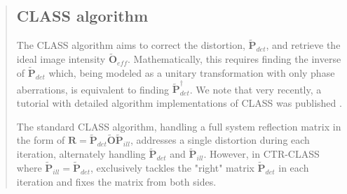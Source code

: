 \documentclass[12pt]{article}
\newenvironment{ourresponse}
    {\begin{tcolorbox}[width=\linewidth,breakable,enhanced,colback=gray!5,colframe=responsecolor!50,title=Response,left=5pt,right=5pt]}
    {\end{tcolorbox}}
\begin{document}
\begin{enumerate}[label=\arabic*.]
\begin{ourresponse}
\begin{quote}
            \subsection*{CLASS algorithm}
            
            The CLASS algorithm \cite{kang17} aims to correct the distortion, $\tilde{\textbf{P}}_{det}$, and retrieve the ideal image intensity ${\tilde{\textbf{O}}_{eff}}$. Mathematically, this requires finding the inverse of $\tilde{\textbf{P}}_{det}$ which, being modeled as a unitary transformation with only phase aberrations, is equivalent to finding $\tilde{\textbf{P}}_{det}^{\dagger}$.
            We note that very recently, a tutorial with detailed algorithm implementations of CLASS was published \cite{kang2024implementation}. 
            
            The standard CLASS algorithm, handling a full system reflection matrix in the form of  $\textbf{R}={\tilde{\textbf{P}}_{det}}{\tilde{\textbf{O}}}{\tilde{\textbf{P}}_{ill}}$, addresses a single distortion during each iteration, alternately handling $\tilde{\textbf{P}}_{det}$ and $\tilde{\textbf{P}}_{ill}$. However, in CTR-CLASS \cite{lee22} where $\tilde{\textbf{P}}_{ill} = \tilde{\textbf{P}}_{det}$, exclusively tackles the "right" matrix $\tilde{\textbf{P}}_{det}$ in each iteration and fixes the matrix from both sides.
            

\end{quote}
\end{ourresponse}
\end{enumerate}
\end{document}
